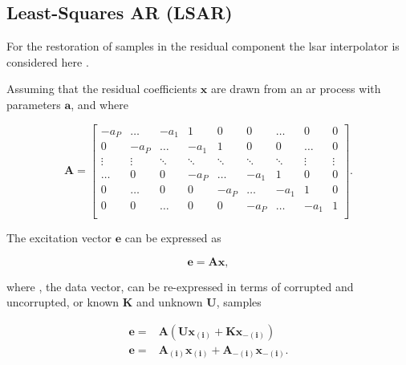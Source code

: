 \subsection{Least-Squares AR (LSAR)}\label{sec:ResidualRestorationLSAR}
For the restoration of samples in the residual component the \DIFdelbegin {}\DIFdelend \DIFaddbegin \gls{lsar} \DIFaddend interpolator is considered here \cite{Godsill1998book}.

Assuming that the residual coefficients $\mathbf{x}$ are drawn from an \DIFdelbegin {}\DIFdelend \DIFaddbegin \gls{ar} \DIFaddend process with parameters $\mathbf{a}$, and where

\begin{equation}\label{eq:LSAR0} \mathbf{A} =
\begin{bmatrix}
    -a_P    & \ldots & -a_1 & 1 & 0 & 0 & \ldots & 0 & 0 \\
    0       & -a_P & \ldots & -a_1 & 1 & 0 & 0 & \ldots & 0 \\
    \vdots  & \vdots    & \ddots & \ddots & \ddots & \ddots & \ddots & \vdots & \vdots \\
    \ldots  & 0 & 0 & -a_P    & \ldots & -a_1 & 1 & 0 & 0 \\
    0       & \ldots  & 0 & 0 & -a_P    & \ldots & -a_1 & 1 & 0 \\
    0       & 0 & \ldots  & 0 & 0 & -a_P    & \ldots & -a_1 & 1 \\
\end{bmatrix}.
\end{equation}

The excitation vector $\mathbf{e}$ can be expressed as

\begin{equation}\label{eq:LSAR1}
  \mathbf{e} = \mathbf{A}\mathbf{x},
\end{equation}

where \DIFdelbegin {}\DIFdelend \DIFaddbegin {}\DIFaddend , the data vector, can be re-expressed in terms of corrupted and uncorrupted, or known $\mathbf{K}$ and unknown $\mathbf{U}$, samples

\begin{align}\label{eq:LSAR2}
  \mathbf{e} = & \mathbf{A} (\mathbf{U}\mathbf{x}_{\mathbf{(i)}} + \mathbf{K}\mathbf{x}_{\mathbf{-(i)}}) \\
  \mathbf{e} = & \mathbf{A}_{\mathbf{(i)}} \mathbf{x}_{\mathbf{(i)}} + \mathbf{A}_{\mathbf{-(i)}}\mathbf{x}_{\mathbf{-(i)}}.
\end{align}

